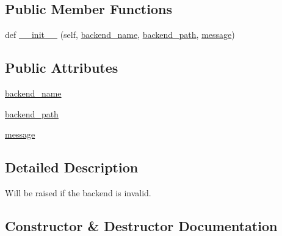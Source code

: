 \subsection*{Public Member Functions}
\begin{DoxyCompactItemize}
\item 
def \hyperlink{classpip_1_1__vendor_1_1pep517_1_1wrappers_1_1BackendInvalid_a5f8817cdeb068e5e8d5a3c9d5ef2f42e}{\+\_\+\+\_\+init\+\_\+\+\_\+} (self, \hyperlink{classpip_1_1__vendor_1_1pep517_1_1wrappers_1_1BackendInvalid_a65d9ed62ef923dbbb8143c8aa9629094}{backend\+\_\+name}, \hyperlink{classpip_1_1__vendor_1_1pep517_1_1wrappers_1_1BackendInvalid_a1f21381c12a4e9db8c077cc96817523e}{backend\+\_\+path}, \hyperlink{classpip_1_1__vendor_1_1pep517_1_1wrappers_1_1BackendInvalid_affb03139293aa07cc0726d00f78a2bfd}{message})
\end{DoxyCompactItemize}
\subsection*{Public Attributes}
\begin{DoxyCompactItemize}
\item 
\hyperlink{classpip_1_1__vendor_1_1pep517_1_1wrappers_1_1BackendInvalid_a65d9ed62ef923dbbb8143c8aa9629094}{backend\+\_\+name}
\item 
\hyperlink{classpip_1_1__vendor_1_1pep517_1_1wrappers_1_1BackendInvalid_a1f21381c12a4e9db8c077cc96817523e}{backend\+\_\+path}
\item 
\hyperlink{classpip_1_1__vendor_1_1pep517_1_1wrappers_1_1BackendInvalid_affb03139293aa07cc0726d00f78a2bfd}{message}
\end{DoxyCompactItemize}


\subsection{Detailed Description}
\begin{DoxyVerb}Will be raised if the backend is invalid.\end{DoxyVerb}
 

\subsection{Constructor \& Destructor Documentation}
\mbox{\label{classpip_1_1__vendor_1_1pep517_1_1wrappers_1_1BackendInvalid_a5f8817cdeb068e5e8d5a3c9d5ef2f42e}} 
